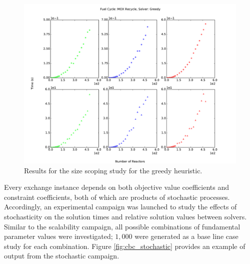 \documentclass{anstrans}
\begin{document}
\begin{figure}
  \begin{center}
    \includegraphics[width=1.5\columnwidth]{base_back_n_rxtr_time_fc1_solvergreedy.pdf}
    \caption[]{
      \label{fig:greedy_size}
      Results for the size scoping study for the greedy heuristic.
      }
  \end{center}
\end{figure}

Every exchange instance depends on both objective value coefficients and
constraint coefficients, both of which are products of stochastic
processes. Accordingly, an experimental campaign was launched to study the
effects of stochasticity on the solution times and relative solution values
between solvers. Similar to the scalability campaign, all possible combinations
of fundamental parameter values were investigated; $1,000$ were generated as a
base line case study for each combination. Figure \ref{fig:cbc_stochastic}
provides an example of output from the stochastic campaign.
\end{document}
